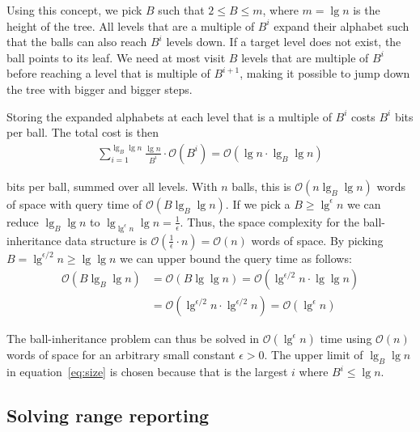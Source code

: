 Using this concept, we pick $B$ such that $2 \leq B \leq m$, where $m = \lg n$ is the height of the tree. All levels that are a multiple of $B^i$ expand their alphabet such that the balls can also reach $B^i$ levels down. If a target level does not exist, the ball points to its leaf. We need at most visit $B$ levels that are multiple of $B^i$ before reaching a level that is multiple of $B^{i+1}$, making it possible to jump down the tree with bigger and bigger steps.

Storing the expanded alphabets at each level that is a multiple of $B^i$ costs $B^i$ bits per ball. The total cost is then 
\begin{align}
  \sum\limits_{i=1}^{\lg_B \lg n} \frac{\lg n}{B^i} \cdot \mathcal{O}(B^i) = \mathcal{O}(\lg n \cdot \lg_B \lg n)
  \label{eq:size}
\end{align}


\noindent bits per ball, summed over all levels. With $n$ balls, this is $\mathcal{O}(n \lg_B \lg n)$ words of space with query time of $\mathcal{O}(B \lg_B \lg n)$. If we pick a $B \geq \lg^\epsilon n$ we can reduce $\lg_B \lg n$ to $\lg_{\lg^\epsilon n} \lg n = \frac{1}{\epsilon}$. Thus, the space complexity for the ball-inheritance data structure is $\mathcal{O}(\frac{1}{\epsilon} \cdot n) = \mathcal{O}(n)$ words of space. By picking $B = \lg^{\epsilon / 2} n \geq \lg \lg n$ we can upper bound the query time as follows:
\begin{align*}
  \mathcal{O}(B \lg_B \lg n) &= \mathcal{O}(B \lg \lg n) = \mathcal{O}(\lg^{\epsilon /2} n \cdot \lg \lg n)\\
  &= \mathcal{O}(\lg^{\epsilon / 2} n \cdot \lg^{\epsilon / 2} n) = \mathcal{O}(\lg^\epsilon n)
\end{align*}

\noindent The ball-inheritance problem can thus be solved in $\mathcal{O}(\lg^\epsilon n)$ time using $\mathcal{O}(n)$ words of space for an arbitrary small constant $\epsilon > 0$. The upper limit of $\lg_B \lg n$ in equation~\ref{eq:size} is chosen because that is the largest $i$ where $B^i \leq \lg n$.

\subsection{Solving range reporting}

